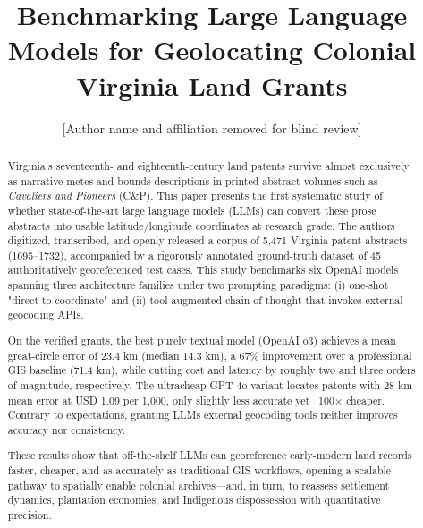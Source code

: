 \documentclass{josis}
\begin{document}
\title{Benchmarking Large Language Models for Geolocating Colonial Virginia Land Grants}
\author{[Author name and affiliation removed for blind review]}

\maketitle


\begin{abstract}
Virginia's seventeenth- and eighteenth-century land patents survive almost exclusively as narrative metes-and-bounds descriptions in printed abstract volumes such as \emph{Cavaliers and Pioneers} (C\&P). This paper presents the first systematic study of whether state-of-the-art large language models (LLMs) can convert these prose abstracts into usable latitude/longitude coordinates at research grade. The authors digitized, transcribed, and openly released a corpus of 5,471 Virginia patent abstracts (1695–1732), accompanied by a rigorously annotated ground-truth dataset of 45 authoritatively georeferenced test cases. This study benchmarks six OpenAI models spanning three architecture families under two prompting paradigms: (i) one-shot "direct-to-coordinate" and (ii) tool-augmented chain-of-thought that invokes external geocoding APIs.

On the verified grants, the best purely textual model (OpenAI o3) achieves a mean great-circle error of 23.4 km (median 14.3 km), a 67\% improvement over a professional GIS baseline (71.4 km), while cutting cost and latency by roughly two and three orders of magnitude, respectively. The ultracheap GPT-4o variant locates patents with 28 km mean error at USD 1.09 per 1,000, only slightly less accurate yet ~100× cheaper. Contrary to expectations, granting LLMs external geocoding tools neither improves accuracy nor consistency.

These results show that off-the-shelf LLMs can georeference early-modern land records faster, cheaper, and as accurately as traditional GIS workflows, opening a scalable pathway to spatially enable colonial archives—and, in turn, to reassess settlement dynamics, plantation economies, and Indigenous dispossession with quantitative precision.
\end{abstract}





\end{document}

